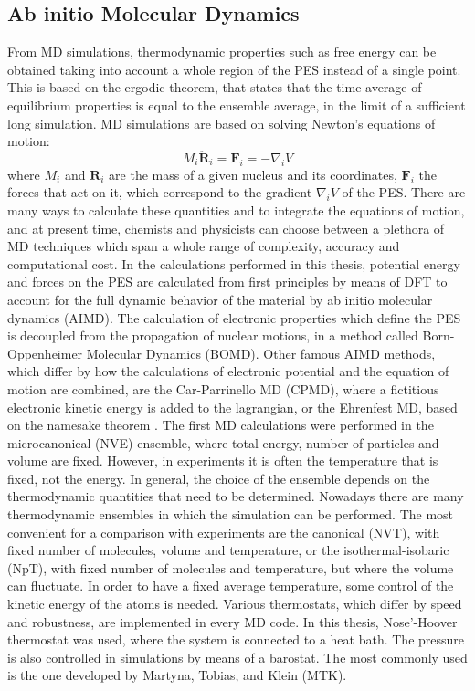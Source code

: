 \subsection{Ab initio Molecular Dynamics}
From MD simulations, thermodynamic properties such as free energy can be obtained taking into account a whole region of the PES instead of a single point. This is based on the ergodic theorem, that states that the time average of equilibrium properties is equal to the ensemble average, in the limit of a sufficient long simulation. MD simulations are based on solving Newton’s equations of motion:
\[
M_i \ddot{\mathbf{R}}_i = \mathbf{F}_i = - \nabla_i V
\]
where $M_i$ and $\mathbf{R}_i$ are the mass of a given nucleus and its coordinates, $\mathbf{F}_i$ the forces that act on it, which correspond to the gradient $\nabla_i V$ of the PES. There are many ways to calculate these quantities and to integrate the equations of motion, and at present time, chemists and physicists can choose between a plethora of MD techniques which span a whole range of complexity, accuracy and computational cost. 
In the calculations performed in this thesis, potential energy and forces on the PES are calculated from first principles by means of DFT to account for the full dynamic behavior of the material by ab initio molecular dynamics (AIMD). The calculation of electronic properties which define the PES is decoupled from the propagation of nuclear motions, in a method called Born-Oppenheimer Molecular Dynamics (BOMD). Other famous AIMD methods, which differ by how the calculations of electronic potential and the equation of motion are combined, are the Car-Parrinello MD (CPMD)\cite{Car1985}, where a fictitious electronic kinetic energy is added to the lagrangian, or the Ehrenfest MD, based on the namesake theorem \cite{Ehrenfest1927, Marx2009}. The first MD calculations were performed in the microcanonical (NVE) ensemble, where total energy, number of particles and volume are fixed. However, in experiments it is often the temperature that is fixed, not the energy. In general, the choice of the ensemble depends on the thermodynamic quantities that need to be determined. Nowadays there are many thermodynamic ensembles in which the simulation can be performed. The most convenient for a comparison with experiments are the canonical (NVT), with fixed number of molecules, volume and temperature, or the isothermal-isobaric (NpT), with fixed number of molecules and temperature, but where the volume can fluctuate. In order to have a fixed average temperature, some control of the kinetic energy of the atoms is needed. Various thermostats, which differ by speed and robustness, are implemented in every MD code. In this thesis, Nose’-Hoover thermostat was used, where the system is connected to a heat bath. The pressure is also controlled in simulations by means of a barostat. The most commonly used is the one developed by Martyna, Tobias, and Klein (MTK)\cite{Martyna1994}.

